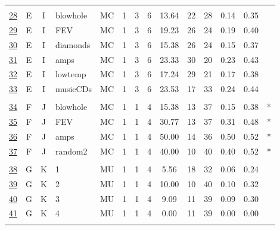 \documentclass[12pt,english,nohyper]{tufte-handout}\usepackage[]{graphicx}\usepackage[]{color}
\begin{document}
\begin{longtable}{cccl|cccc|ccccc|l}
   &  &  &  &  &  &  &  &  &  &  &  &  &  \\ 
  \hyperlink{T03.E.I.06.3.1.MC.blowhole.2}{28} & E & I & blowhole & MC &   1 &   3 &   6 & 13.64 &  22 &  28 & 0.14 & 0.35 &  \\ 
  \hyperlink{T03.E.I.06.3.1.MC.FEV.2}{29} & E & I & FEV & MC &   1 &   3 &   6 & 19.23 &  26 &  24 & 0.19 & 0.40 &  \\ 
  \hyperlink{T03.E.I.06.3.1.MC.diamonds.2}{30} & E & I & diamonds & MC &   1 &   3 &   6 & 15.38 &  26 &  24 & 0.15 & 0.37 &  \\ 
  \hyperlink{T03.E.I.06.3.1.MC.amps.2}{31} & E & I & amps & MC &   1 &   3 &   6 & 23.33 &  30 &  20 & 0.23 & 0.43 &  \\ 
  \hyperlink{T03.E.I.06.3.1.MC.lowtemp.2}{32} & E & I & lowtemp & MC &   1 &   3 &   6 & 17.24 &  29 &  21 & 0.17 & 0.38 &  \\ 
  \hyperlink{T03.E.I.06.3.1.MC.musicCDs.2}{33} & E & I & musicCDs & MC &   1 &   3 &   6 & 23.53 &  17 &  33 & 0.24 & 0.44 &  \\ 
   &  &  &  &  &  &  &  &  &  &  &  &  &  \\ 
  \hyperlink{T03.F.J.04.1.1.MC.blowhole.2}{34} & F & J & blowhole & MC &   1 &   1 &   4 & 15.38 &  13 &  37 & 0.15 & 0.38 & * \\ 
  \hyperlink{T03.F.J.04.1.1.MC.FEV.2}{35} & F & J & FEV & MC &   1 &   1 &   4 & 30.77 &  13 &  37 & 0.31 & 0.48 & * \\ 
  \hyperlink{T03.F.J.04.1.1.MC.amps.2}{36} & F & J & amps & MC &   1 &   1 &   4 & 50.00 &  14 &  36 & 0.50 & 0.52 & * \\ 
  \hyperlink{T03.F.J.04.1.1.MC.random2.2}{37} & F & J & random2 & MC &   1 &   1 &   4 & 40.00 &  10 &  40 & 0.40 & 0.52 & * \\ 
   &  &  &  &  &  &  &  &  &  &  &  &  &  \\ 
  \hyperlink{T03.G.K.04.1.1.MU.1.2}{38} & G & K & 1 & MU &   1 &   1 &   4 & 5.56 &  18 &  32 & 0.06 & 0.24 &  \\ 
  \hyperlink{T03.G.K.04.1.1.MU.2.2}{39} & G & K & 2 & MU &   1 &   1 &   4 & 10.00 &  10 &  40 & 0.10 & 0.32 &  \\ 
  \hyperlink{T03.G.K.04.1.1.MU.3.2}{40} & G & K & 3 & MU &   1 &   1 &   4 & 9.09 &  11 &  39 & 0.09 & 0.30 &  \\ 
  \hyperlink{T03.G.K.04.1.1.MU.4.2}{41} & G & K & 4 & MU &   1 &   1 &   4 & 0.00 &  11 &  39 & 0.00 & 0.00 &  \\ 
   &  &  &  &  &  &  &  &  &  &  &  &  &  \\ 

\end{longtable}
\end{document}
